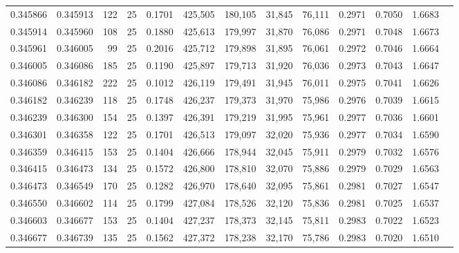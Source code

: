 \begin{tabular}{rrrrrrrrrrrrr}
0.345866 & 0.345913 &   122 &  25 &                                     0.1701 & 425,505 & 180,105 &  31,845 &  76,111 & 0.2971 & 0.7050 & 1.6683 \\
0.345914 & 0.345960 &   108 &  25 &                                     0.1880 & 425,613 & 179,997 &  31,870 &  76,086 & 0.2971 & 0.7048 & 1.6673 \\
0.345961 & 0.346005 &    99 &  25 &                                     0.2016 & 425,712 & 179,898 &  31,895 &  76,061 & 0.2972 & 0.7046 & 1.6664 \\
0.346005 & 0.346086 &   185 &  25 &                                     0.1190 & 425,897 & 179,713 &  31,920 &  76,036 & 0.2973 & 0.7043 & 1.6647 \\
0.346086 & 0.346182 &   222 &  25 &                                     0.1012 & 426,119 & 179,491 &  31,945 &  76,011 & 0.2975 & 0.7041 & 1.6626 \\
0.346182 & 0.346239 &   118 &  25 &                                     0.1748 & 426,237 & 179,373 &  31,970 &  75,986 & 0.2976 & 0.7039 & 1.6615 \\
0.346239 & 0.346300 &   154 &  25 &                                     0.1397 & 426,391 & 179,219 &  31,995 &  75,961 & 0.2977 & 0.7036 & 1.6601 \\
0.346301 & 0.346358 &   122 &  25 &                                     0.1701 & 426,513 & 179,097 &  32,020 &  75,936 & 0.2977 & 0.7034 & 1.6590 \\
0.346359 & 0.346415 &   153 &  25 &                                     0.1404 & 426,666 & 178,944 &  32,045 &  75,911 & 0.2979 & 0.7032 & 1.6576 \\
0.346415 & 0.346473 &   134 &  25 &                                     0.1572 & 426,800 & 178,810 &  32,070 &  75,886 & 0.2979 & 0.7029 & 1.6563 \\
0.346473 & 0.346549 &   170 &  25 &                                     0.1282 & 426,970 & 178,640 &  32,095 &  75,861 & 0.2981 & 0.7027 & 1.6547 \\
0.346550 & 0.346602 &   114 &  25 &                                     0.1799 & 427,084 & 178,526 &  32,120 &  75,836 & 0.2981 & 0.7025 & 1.6537 \\
0.346603 & 0.346677 &   153 &  25 &                                     0.1404 & 427,237 & 178,373 &  32,145 &  75,811 & 0.2983 & 0.7022 & 1.6523 \\
0.346677 & 0.346739 &   135 &  25 &                                     0.1562 & 427,372 & 178,238 &  32,170 &  75,786 & 0.2983 & 0.7020 & 1.6510 \\

\end{tabular}
